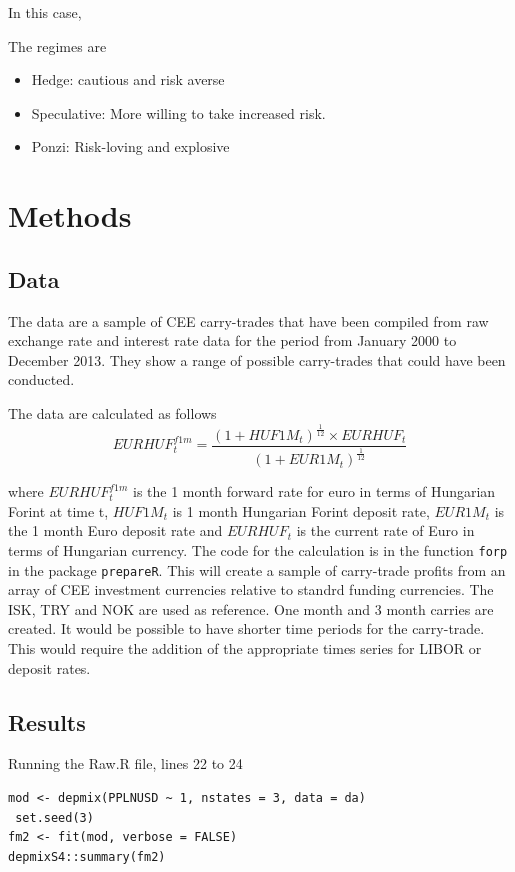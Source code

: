 \documentclass[12pt, a4paper, oneside]{article} %
\begin{document}
In this case, 

The regimes are
\begin{itemize}
\item Hedge: cautious and risk averse
\item Speculative: More willing to take increased risk. 
\item Ponzi:  Risk-loving and explosive
\end{itemize}


\section{Methods}
\subsection{Data}
The data are a sample of CEE carry-trades that have been compiled from raw exchange rate and interest rate data for the period from January 2000 to December 2013.  They show a range of possible carry-trades that could have been conducted. 

The data are calculated as follows
\begin{equation}\label{eqref:forward}
EURHUF_t^{f1m} = \frac{(1 + HUF1M_t)^{\frac{1}{12}} \times EURHUF_t }{(1 + EUR1M_t)^{\frac{1}{12}}}
\end{equation}

where  $EURHUF_t^{f1m}$ is the 1 month forward rate for euro in terms of Hungarian Forint at time t, $HUF1M_t$ is 1 month Hungarian Forint deposit rate, $EUR1M_t$ is the 1 month Euro deposit rate and $EURHUF_t$ is the current rate of Euro in terms of Hungarian currency.  The code for the calculation is in the function \lstinline{forp} in the package \lstinline{prepareR}. This will create a sample of carry-trade profits from an array of CEE investment currencies relative to standrd funding currencies.   The ISK, TRY and NOK are used as reference.  One month and 3 month carries are created.  It would be possible to have shorter time periods for the carry-trade.   This would require the addition of the appropriate times series for LIBOR or deposit rates.  

\subsection{Results}
Running the Raw.R file, lines 22 to 24
\begin{lstlisting}
mod <- depmix(PPLNUSD ~ 1, nstates = 3, data = da)
 set.seed(3)
fm2 <- fit(mod, verbose = FALSE)
depmixS4::summary(fm2)
\end{lstlisting}
\end{document}
